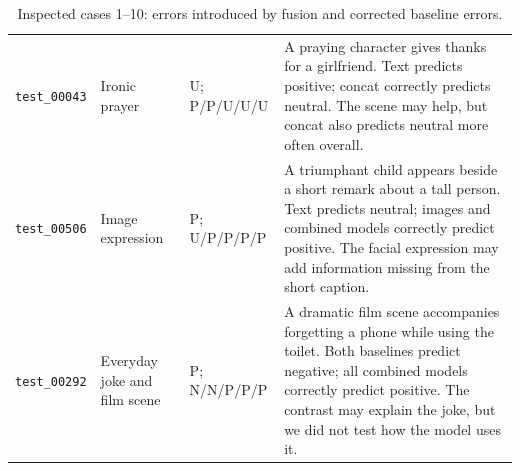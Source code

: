 \documentclass[11pt,a4paper]{article}
\begin{document}
\begin{table}[p]
\begin{tabular}{>{\raggedright\arraybackslash}p{1.95cm}>{\raggedright\arraybackslash}p{2.30cm}>{\raggedright\arraybackslash}p{2.1cm}>{\raggedright\arraybackslash}p{7.1cm}}
\texttt{test\_00043} & Ironic prayer & U; P/P/U/U/U & A praying character gives thanks for a girlfriend. Text predicts positive; concat correctly predicts neutral. The scene may help, but concat also predicts neutral more often overall. \\[4pt]
\texttt{test\_00506} & Image expression & P; U/P/P/P/P & A triumphant child appears beside a short remark about a tall person. Text predicts neutral; images and combined models correctly predict positive. The facial expression may add information missing from the short caption. \\[4pt]
\texttt{test\_00292} & Everyday joke and film scene & P; N/N/P/P/P & A dramatic film scene accompanies forgetting a phone while using the toilet. Both baselines predict negative; all combined models correctly predict positive. The contrast may explain the joke, but we did not test how the model uses it. \\[4pt]
\bottomrule
\end{tabular}
\caption{Inspected cases 1--10: errors introduced by fusion and corrected baseline errors.}
\label{tab:cases}
\end{table}
\end{document}
